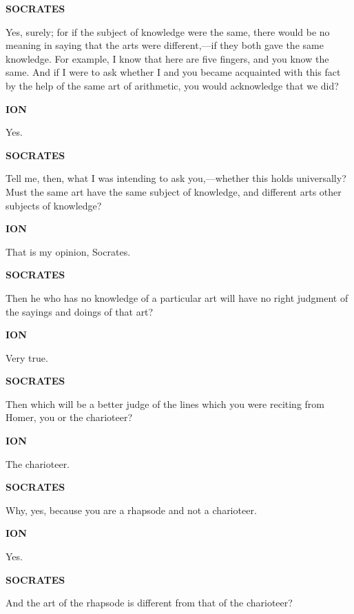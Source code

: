 \documentclass[11pt,letter]{article}
\begin{document}
\par \textbf{SOCRATES}
\par   Yes, surely; for if the subject of knowledge were the same, there would be no meaning in saying that the arts were different,—if they both gave the same knowledge. For example, I know that here are five fingers, and you know the same. And if I were to ask whether I and you became acquainted with this fact by the help of the same art of arithmetic, you would acknowledge that we did?

\par \textbf{ION}
\par   Yes.

\par \textbf{SOCRATES}
\par   Tell me, then, what I was intending to ask you,—whether this holds universally? Must the same art have the same subject of knowledge, and different arts other subjects of knowledge?

\par \textbf{ION}
\par   That is my opinion, Socrates.

\par \textbf{SOCRATES}
\par   Then he who has no knowledge of a particular art will have no right judgment of the sayings and doings of that art?

\par \textbf{ION}
\par   Very true.

\par \textbf{SOCRATES}
\par   Then which will be a better judge of the lines which you were reciting from Homer, you or the charioteer?

\par \textbf{ION}
\par   The charioteer.

\par \textbf{SOCRATES}
\par   Why, yes, because you are a rhapsode and not a charioteer.

\par \textbf{ION}
\par   Yes.

\par \textbf{SOCRATES}
\par   And the art of the rhapsode is different from that of the charioteer?
\end{document}
